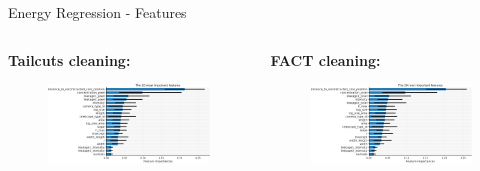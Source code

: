 \begin{frame}{Energy Regression - Features}
    \begin{columns}[T] %
        \begin{column}{.48\textwidth}
            \textbf{Tailcuts cleaning:}
            \vspace{5pt}
            \begin{figure}
                \includegraphics[width=\linewidth]{images/result_plots/tail1/reg_diff_4-crop.pdf}                
            \end{figure}
        \end{column}
        \begin{column}{.48\textwidth}
            \textbf{FACT cleaning:}
            \vspace{5pt}
            \begin{figure}
                \includegraphics[width=\linewidth]{images/result_plots/fact2/reg_diff_4-crop.pdf}                
            \end{figure}
        \end{column}
    \end{columns}
\end{frame}
